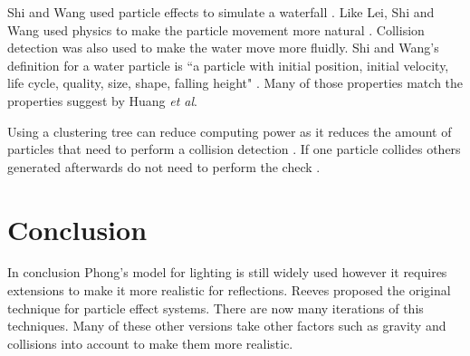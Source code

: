 \documentclass{scrartcl}
\begin{document}
Shi and Wang used particle effects to simulate a waterfall \cite{Shi}. Like Lei, Shi and Wang used physics to make the particle movement more natural \cite{Lei, Shi}. Collision detection was also used to make the water move more fluidly.  Shi and Wang's definition for a water particle is ``a particle with initial position, initial velocity, life cycle, quality, size, shape, falling height"  \cite[p.1]{Shi}. Many of those properties match the properties suggest by Huang \textit{et al}.

Using a clustering tree can reduce computing power as it reduces the amount of particles that need to perform a collision detection \cite{Shi}. If one particle collides others generated afterwards do not need to perform the check \cite{Shi}.


\section{Conclusion}
In conclusion Phong's model for lighting is still widely used however it requires extensions to make it more realistic for reflections. 
Reeves proposed the original technique for particle effect systems. There are now many iterations of this techniques. Many of these other versions take other factors such as gravity and collisions into account to make them more realistic. 

	


	
\end{document}
